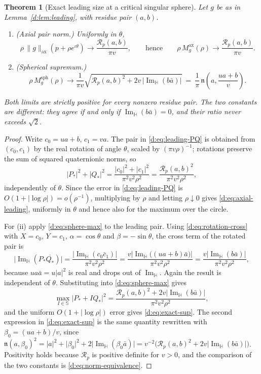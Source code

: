\documentclass[11pt,a4paper]{article}
\numberwithin{equation}{section}
\newtheorem{theorem}{Theorem}[section]
\theoremstyle{definition}
\theoremstyle{remark}
\theoremstyle{plain}
\newcommand{\HH}{\mathbb H}
\newcommand{\SSS}{\mathbb S}
\DeclareMathOperator{\Ima}{Im}
\newcommand{\ImH}{\Ima_{\HH}}
\newcommand{\Rp}{\mathcal R_{p}}      %
\newcommand{\nn}{\mathfrak n}         %
\newcommand{\axn}[1]{\lVert #1\rVert_{\mathrm{ax}}}   %
\newcommand{\Msph}{M^{\mathrm{sph}}}                  %
\newcommand{\Max}{M^{\mathrm{ax}}}                    %
\newcommand{\abs}[1]{\lvert #1\rvert}
\begin{document}
\begin{theorem}[Exact leading size at a critical singular sphere]
\label{d:thm:leading}
Let $g$ be as in Lemma~\textup{\ref{d:lem:leading}}, with residue pair
$(a,b)$.
\begin{enumerate}[label=\textup{(\roman*)}]
\item \textup{(Axial pair norm.)}  Uniformly in $\theta$,
\begin{equation}
 \rho\,\axn g(p+\rho e^{\iota\theta})\longrightarrow
 \frac{\Rp(a,b)}{\pi v},
 \qquad\text{hence}\qquad
 \rho\,\Max_g(\rho)\longrightarrow\frac{\Rp(a,b)}{\pi v}.
 \label{d:eq:axial-leading}
\end{equation}
\item \textup{(Spherical supremum.)}
\begin{equation}
 \rho\,\Msph_g(\rho)\longrightarrow
 \frac1{\pi v}
 \sqrt{\Rp(a,b)^2+2v\,\bigl\lvert\ImH(b\bar a)\bigr\rvert}
 \ =\ \frac1\pi\,\nn\!\left(a,\frac{ua+b}{v}\right).
 \label{d:eq:exact-sup}
\end{equation}
\end{enumerate}
Both limits are strictly positive for every nonzero residue pair.  The two
constants are different: they agree if and only if $\ImH(b\bar a)=0$, and
their ratio never exceeds $\sqrt2$.
\end{theorem}

\begin{proof}
Write $c_0=ua+b$, $c_1=va$.  The pair in \eqref{d:eq:leading-PQ} is
obtained from $(c_0,c_1)$ by the real rotation of angle $\theta$, scaled by
$(\pi v\rho)^{-1}$; rotations preserve the sum of squared quaternionic
norms, so
\[
 \abs{P_*}^2+\abs{Q_*}^2
 =\frac{\abs{c_0}^2+\abs{c_1}^2}{\pi^2v^2\rho^2}
 =\frac{\Rp(a,b)^2}{\pi^2v^2\rho^2},
\]
independently of $\theta$.  Since the error in \eqref{d:eq:leading-PQ} is
$O(1+\abs{\log\rho})=o(\rho^{-1})$, multiplying by $\rho$ and letting
$\rho\downarrow0$ gives \eqref{d:eq:axial-leading}, uniformly in $\theta$
and hence also for the maximum over the circle.

For (ii) apply \eqref{d:eq:sphere-max} to the leading pair.  Using
\eqref{d:eq:rotation-cross} with $X=c_0$, $Y=c_1$, $\alpha=\cos\theta$ and
$\beta=-\sin\theta$, the cross term of the rotated pair is
\[
 \bigl\lvert\ImH(P_*\overline{Q_*})\bigr\rvert
 =\frac{\bigl\lvert\ImH(c_0\bar c_1)\bigr\rvert}{\pi^2v^2\rho^2}
 =\frac{v\bigl\lvert\ImH\bigl((ua+b)\bar a\bigr)\bigr\rvert}
        {\pi^2v^2\rho^2}
 =\frac{v\bigl\lvert\ImH(b\bar a)\bigr\rvert}{\pi^2v^2\rho^2},
\]
because $ua\bar a=u\abs a^2$ is real and drops out of $\ImH$.  Again the
result is independent of $\theta$.  Substituting into
\eqref{d:eq:sphere-max} gives
\[
 \max_{I\in\SSS}\abs{P_*+IQ_*}^2
 =\frac{\Rp(a,b)^2+2v\abs{\ImH(b\bar a)}}{\pi^2v^2\rho^2},
\]
and the uniform $O(1+\abs{\log\rho})$ error gives
\eqref{d:eq:exact-sup}.  The second expression in \eqref{d:eq:exact-sup}
is the same quantity rewritten with $\beta_0=(ua+b)/v$, since
$\nn(a,\beta_0)^2=\abs a^2+\abs{\beta_0}^2
 +2\abs{\ImH(\beta_0\bar a)}
 =v^{-2}\bigl(\Rp(a,b)^2+2v\abs{\ImH(b\bar a)}\bigr)$.
Positivity holds because $\Rp$ is positive definite for $v>0$, and the
comparison of the two constants is \eqref{d:eq:norm-equivalence}.
\end{proof}
\end{document}
